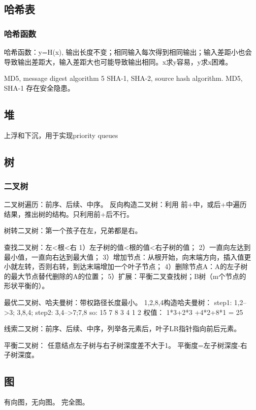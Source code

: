 \documentclass[UTF8]{../computerUniverse}
\begin{document}
\subsection{哈希表}

\subsubsection{哈希函数}
哈希函数：y=H(x), 输出长度不变；相同输入每次得到相同输出；输入差距小也会导致输出差距大，输入差距大也可能导致输出相同。x求y容易，y求x困难。

MD5, message digest algorithm 5
SHA-1, SHA-2, source hash algorithm.
MD5, SHA-1 存在安全隐患。




\subsection{堆}
上浮和下沉，用于实现priority queues


\subsection{树}


\subsubsection{二叉树}

二叉树遍历：前序、后续、中序。
反向构造二叉树：利用 前+中，或后+中遍历结果，推出树的结构。只利用前+后不行。

树转二叉树：第一个孩子在左，兄弟都是右。


查找二叉树：左<根<右
1）左子树的值<根的值<右子树的值；
2）一直向左达到最小值，一直向右达到最大值；
3）增加节点：从根开始，向末端方向，插入值更小就左转，否则右转，到达末端增加一个叶子节点；
4）删除节点A：A的左子树的最大节点替代删除的A的位置；
5）扩展：平衡二叉查找树；B树（m个节点的形状平衡的）。



最优二叉树、哈夫曼树：带权路径长度最小。 
1,2,8,4构造哈夫曼树：
step1: 1,2-->3; 3,8,4;
step2: 3,4-->7;7,8
so:        15
      7       8
   3    4
1    2
权值： 1*3+2*3 +4*2+8*1 = 25

线索二叉树：前序、后续、中序，列举各元素后，叶子LR指针指向前后元素。

平衡二叉树：
任意结点左子树与右子树深度差不大于1。
平衡度=左子树深度-右子树深度。



\subsection{图}
有向图，无向图。
完全图。
\end{document}
